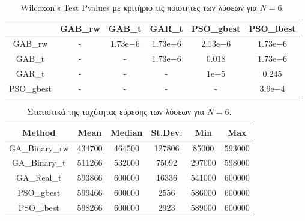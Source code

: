\documentclass[12pt, a4paper]{article}
\newcommand{\en}{\selectlanguage{english}}
\newcommand{\gr}{\selectlanguage{greek}}
\begin{document}
\begin{table}[H]
	\centering
	\begin{tabular}{| c | c | c | c | c | c |}
		
		\hline
		\en  & \en GAB\_rw & \en GAB\_t & \en GAR\_t & \en PSO\_gbest & \en PSO\_lbest\\
		
		\hline
		\en GAB\_rw & - & $1.73\mathrm{e}{-6}$ & $1.73\mathrm{e}{-6}$ & $2.13\mathrm{e}{-6}$ & $1.73\mathrm{e}{-6}$ \\ 
		
		\hline
		\en GAB\_t & - & - & $1.73\mathrm{e}{-6}$ & $0.018$ & $1.73\mathrm{e}{-6}$ \\ 
		
		\hline
		\en GAR\_t & - & - & - & $1\mathrm{e}{-5}$ & $0.245$ \\ 
		
		\hline
		\en PSO\_gbest & - & - & - & - & $3.9\mathrm{e}{-4}$\\ 
		
		\hline
		
	\end{tabular}
	\caption{\en Wilcoxon's Test Pvalues \gr με κριτήριο τις ποιότητες των λύσεων για $N = 6$.}
	\label{tab:sol_qual_pval_N6}
\end{table}


\begin{table}[H]
	\centering
	\begin{tabular}{| c | c | c | c | c | c |}
		
		\hline
		\en Method & \en Mean & \en Median & \en St.Dev. & \en Min & \en Max \\
		
		\hline
		\en GA\_Binary\_rw & 434700 & 464500 & 127806 & 85000 & 593000 \\ 
		
		\hline
		\en GA\_Binary\_t & 511266 & 532000 & 75092 & 297000 & 598000 \\ 
		
		\hline
		\en GA\_Real\_t & 593866 & 600000 & 16336 & 541000 & 600000 \\ 
		
		\hline
		\en PSO\_gbest & 599466 & 600000 & 2556 & 586000 & 600000\\ 
		
		\hline
		\en PSO\_lbest & 598266 & 600000 & 2923 & 589000 & 600000 \\ 
		
		\hline
		
	\end{tabular}
	\caption{Στατιστικά της ταχύτητας εύρεσης των λύσεων για $N = 6$.}
	\label{tab:iter_N6}
\end{table}
\end{document}
